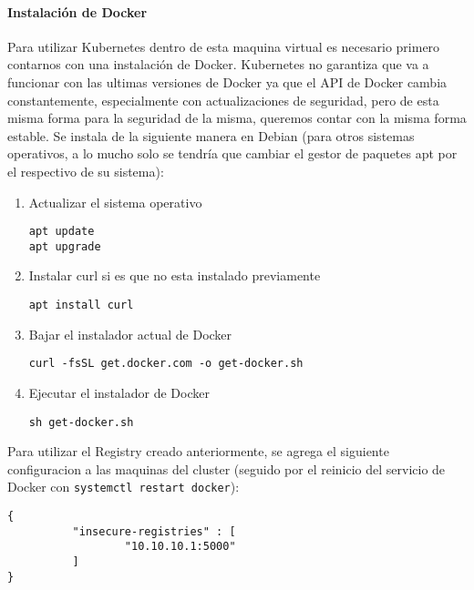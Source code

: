 \paragraph{Instalación de Docker}
Para utilizar Kubernetes dentro de esta maquina virtual es necesario primero contarnos con una instalación de Docker. Kubernetes no garantiza que va a funcionar con las ultimas versiones de Docker ya que el API de Docker cambia constantemente, especialmente con actualizaciones de seguridad, pero de esta misma forma para la seguridad de la misma, queremos contar con la misma forma estable. Se instala de la siguiente manera en Debian (para otros sistemas operativos, a lo mucho solo se tendría que cambiar el gestor de paquetes apt por el respectivo de su sistema):
\begin{enumerate}
	\item Actualizar el sistema operativo
    \begin{lstlisting}
apt update
apt upgrade
    \end{lstlisting}
    \item Instalar curl si es que no esta instalado previamente
    \begin{lstlisting}
apt install curl
    \end{lstlisting}
    \item Bajar el instalador actual de Docker
    \begin{lstlisting}
curl -fsSL get.docker.com -o get-docker.sh
    \end{lstlisting}
    \item Ejecutar el instalador de Docker
    \begin{lstlisting}
sh get-docker.sh
    \end{lstlisting}
\end{enumerate}

Para utilizar el Registry creado anteriormente, se agrega el siguiente configuracion a las maquinas del cluster (seguido por el reinicio del servicio de Docker con \texttt{systemctl restart docker}):
\begin{lstlisting}
{
          "insecure-registries" : [
                  "10.10.10.1:5000"
          ]
}
\end{lstlisting}

